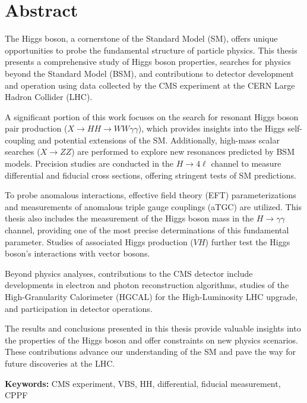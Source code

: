 \chapter*{Abstract}



The Higgs boson, a cornerstone of the Standard Model (SM), offers unique opportunities to probe the fundamental
structure of particle physics.
This thesis presents a comprehensive study of Higgs boson properties, searches for physics beyond the
Standard Model (BSM), and contributions to detector development and operation using data collected by
the CMS experiment at the CERN Large Hadron Collider (LHC).

A significant portion of this work focuses on the search for resonant Higgs boson pair production
(\(X \to HH \to WW\gamma\gamma\)), which provides insights into the Higgs self-coupling and potential
extensions of the SM.
Additionally, high-mass scalar searches (\(X \to ZZ\)) are performed to explore new resonances
predicted by BSM models.
Precision studies are conducted in the \(H \to 4\ell\) channel to measure differential and fiducial cross sections,
offering stringent tests of SM predictions.

To probe anomalous interactions, effective field theory (EFT) parameterizations and measurements of
anomalous triple gauge couplings (aTGC) are utilized.
This thesis also includes the measurement of the Higgs boson mass in the \(H \to \gamma\gamma\) channel,
providing one of the most precise determinations of this fundamental parameter.
Studies of associated Higgs production (\(VH\)) further test the Higgs boson's interactions with vector bosons.

Beyond physics analyses, contributions to the CMS detector include developments in electron and photon
reconstruction algorithms, studies of the High-Granularity Calorimeter (HGCAL) for the High-Luminosity LHC
upgrade, and participation in detector operations.

The results and conclusions presented in this thesis provide valuable insights into the properties of
the Higgs boson and offer constraints on new physics scenarios.
These contributions advance our understanding of the SM and pave the way for future discoveries at the LHC.

\vspace*{2em}

\noindent \textbf{Keywords:} {CMS experiment, VBS, HH, differential, fiducial measurement, CPPF}
